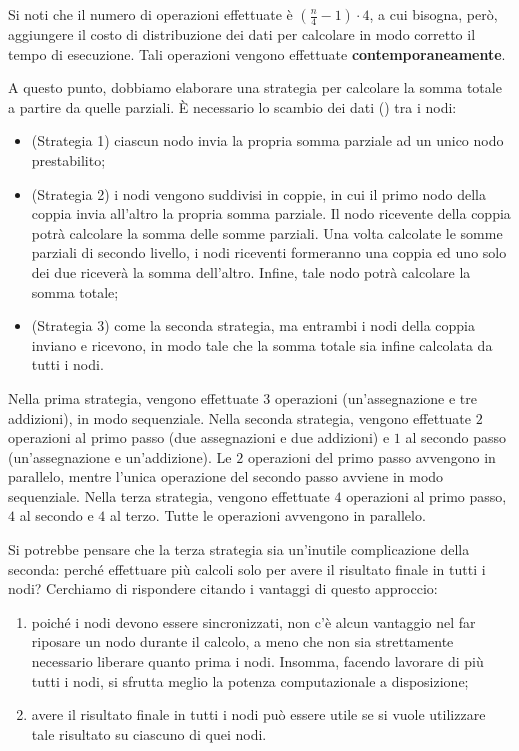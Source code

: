 \begin{note}{}
  Si noti che il numero di operazioni effettuate è $(\frac{n}{4} - 1)\cdot 4$, a cui bisogna, però, aggiungere il costo di distribuzione dei dati per calcolare in modo corretto il tempo di esecuzione. Tali operazioni vengono effettuate \textbf{contemporaneamente}.
\end{note}

A questo punto, dobbiamo elaborare una strategia per calcolare la somma totale a partire da quelle parziali. È necessario lo scambio dei dati () tra i nodi:
\begin{itemize}
  \item (Strategia 1) ciascun nodo invia la propria somma parziale ad un unico nodo prestabilito;
  \item (Strategia 2) i nodi vengono suddivisi in coppie, in cui il primo nodo della coppia invia all'altro la propria somma parziale. Il nodo ricevente della coppia potrà calcolare la somma delle somme parziali. Una volta calcolate le somme parziali di secondo livello, i nodi riceventi formeranno una coppia ed uno solo dei due riceverà la somma dell'altro. Infine, tale nodo potrà calcolare la somma totale;
  \item (Strategia 3) come la seconda strategia, ma entrambi i nodi della coppia inviano e ricevono, in modo tale che la somma totale sia infine calcolata da tutti i nodi.
\end{itemize}
Nella prima strategia, vengono effettuate $3$ operazioni (un'assegnazione e tre addizioni), in modo sequenziale. Nella seconda strategia, vengono effettuate $2$ operazioni al primo passo (due assegnazioni e due addizioni) e $1$ al secondo passo (un'assegnazione e un'addizione). 
Le $2$ operazioni del primo passo avvengono in parallelo, mentre l'unica operazione del secondo passo avviene in modo sequenziale.
Nella terza strategia, vengono effettuate $4$ operazioni al primo passo, $4$ al secondo e $4$ al terzo. Tutte le operazioni avvengono in parallelo.

\begin{note}{}
  Si potrebbe pensare che la terza strategia sia un'inutile complicazione della seconda: perché effettuare più calcoli solo per avere il risultato finale in tutti i nodi? Cerchiamo di rispondere citando i vantaggi di questo approccio:
  \begin{enumerate}
    \item poiché i nodi devono essere sincronizzati, non c'è alcun vantaggio nel far riposare un nodo durante il calcolo, a meno che non sia strettamente necessario liberare quanto prima i nodi. Insomma, facendo lavorare di più tutti i nodi, si sfrutta meglio la potenza computazionale a disposizione;
    \item avere il risultato finale in tutti i nodi può essere utile se si vuole utilizzare tale risultato su ciascuno di quei nodi.
  \end{enumerate}
\end{note}

